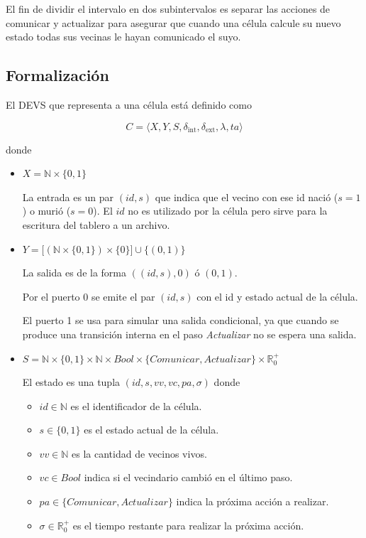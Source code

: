 \documentclass[12pt]{article}
\newcommand{\dint}{\delta_{\text{int}}}
\newcommand{\dext}{\delta_{\text{ext}}}
\newcommand{\R}{\mathbb{R}}
\newcommand{\N}{\mathbb{N}}
\begin{document}
El fin de dividir el intervalo en dos subintervalos es separar las acciones de comunicar y actualizar para asegurar que cuando una célula calcule su nuevo estado todas sus vecinas le hayan comunicado el suyo.


\subsection{Formalización}


El DEVS que representa a una célula está definido como

\[ C = \langle X, Y, S, \dint, \dext, \lambda, ta \rangle \]

donde

\begin{itemize}
  \item $X = \N \times \{0,1\}$

    La entrada es un par $(id, s)$ que indica que el vecino con ese id nació ($s=1$) o murió ($s=0$). El $id$ no es utilizado por la célula pero sirve para la escritura del tablero a un archivo.

  \item $Y = \big[ (\N \times \{0,1\}) \times \{0\} \big] \cup \{(0, 1)\}$

    La salida es de la forma $((id, s), 0)$ ó $(0, 1)$.

    Por el puerto 0 se emite el par $(id, s)$ con el id y estado actual de la célula.

    El puerto 1 se usa para simular una salida condicional, ya que cuando se produce una transición interna en el paso \textit{Actualizar} no se espera una salida.

  \item $S = \N \times \{0, 1\} \times \N \times Bool \times \{Comunicar, Actualizar\} \times \R_0^+$

    El estado es una tupla $(id, s, vv, vc, pa, \sigma)$ donde

    \begin{itemize}
      \item $id \in \N$ es el identificador de la célula.
      \item $s \in \{0, 1\}$ es el estado actual de la célula.
      \item $vv \in \N$ es la cantidad de vecinos vivos.
      \item $vc \in Bool$ indica si el vecindario cambió en el último paso.
      \item $pa \in \{Comunicar, Actualizar\}$ indica la próxima acción a realizar.
      \item $\sigma \in \R_0^+$ es el tiempo restante para realizar la próxima acción.
    \end{itemize}


\end{itemize}
\end{document}
